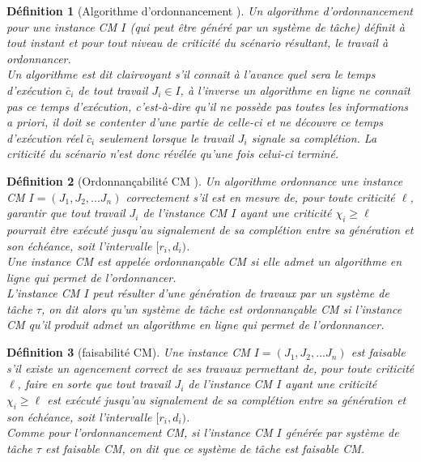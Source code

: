 \documentclass[a4paper]{report}
\theoremstyle{break}
\newtheorem{defin}{Définition}
\theoremstyle{breakplain}
\begin{document}
\begin{defin}[Algorithme d'ordonnancement \cite{baruah2010towards}]
Un algorithme d'ordonnancement pour une instance CM $I$ (qui peut être généré par un système de tâche) définit à tout instant et pour tout niveau de criticité du scénario résultant, le travail à ordonnancer.\\
Un algorithme est dit clairvoyant s'il connaît à l'avance quel sera le temps d'exécution $\bar{c}_i$ de tout travail $J_i \in I$, à l'inverse un algorithme en ligne ne connaît pas ce temps d'exécution, c'est-à-dire qu'il ne possède pas toutes les informations a priori, il doit se contenter d'une partie de celle-ci et ne découvre ce temps d'exécution réel $\bar{c}_i$ seulement lorsque le travail $J_i$ signale sa complétion. La criticité du scénario n'est donc révélée qu'une fois celui-ci terminé.
\end{defin}

\begin{defin}[Ordonnançabilité CM \cite{BaruahBDMSS11}]
Un algorithme ordonnance une instance CM $I = (J_1, J_2, ... J_n)$ correctement s'il est en mesure de, pour toute criticité $\ell$, garantir que tout travail $J_i$ de l'instance CM $I$ ayant une criticité $\chi_i \geq \ell$ pourrait être exécuté jusqu'au signalement de sa complétion entre sa génération et son échéance, soit l'intervalle $[r_i, d_i)$.\\ Une instance CM est appelée ordonnançable CM si elle admet un algorithme en ligne qui permet de l'ordonnancer.\\
L'instance CM $I$ peut résulter d'une génération de travaux par un système de tâche $\tau$, on dit alors qu'un système de tâche est ordonnançable CM si l'instance CM qu'il produit admet un algorithme en ligne qui permet de l'ordonnancer.
\end{defin}

\begin{defin}[faisabilité CM]
Une instance CM $I = (J_1, J_2, ... J_n)$ est faisable s'il existe un agencement correct de ses travaux permettant de, pour toute criticité $\ell$, faire en sorte que tout travail $J_i$ de l'instance CM $I$ ayant une criticité $\chi_i \geq \ell$ est exécuté jusqu'au signalement de sa complétion entre sa génération et son échéance, soit l'intervalle $[r_i, d_i)$.\\
Comme pour l'ordonnancement CM, si l'instance CM $I$ générée par système de tâche $\tau$ est faisable CM, on dit que ce système de tâche est faisable CM.
\end{defin}
\end{document}
